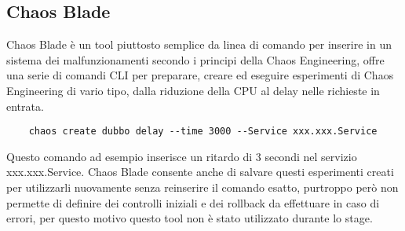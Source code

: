 \subsection{Chaos Blade}
Chaos Blade è un tool piuttosto semplice da linea di comando per inserire in un sistema dei malfunzionamenti secondo i principi della Chaos Engineering, offre una serie di comandi CLI per preparare, creare ed eseguire esperimenti di Chaos Engineering di vario tipo, dalla riduzione della CPU al delay nelle richieste in entrata.
\begin{verbatim}
    chaos create dubbo delay --time 3000 --Service xxx.xxx.Service
\end{verbatim}
Questo comando ad esempio inserisce un ritardo di 3 secondi nel servizio xxx.xxx.Service.
Chaos Blade consente anche di salvare questi esperimenti creati per utilizzarli nuovamente senza reinserire il comando esatto, purtroppo però non permette di definire dei controlli iniziali e dei rollback da effettuare in caso di errori, per questo motivo questo tool non è stato utilizzato durante lo stage.

